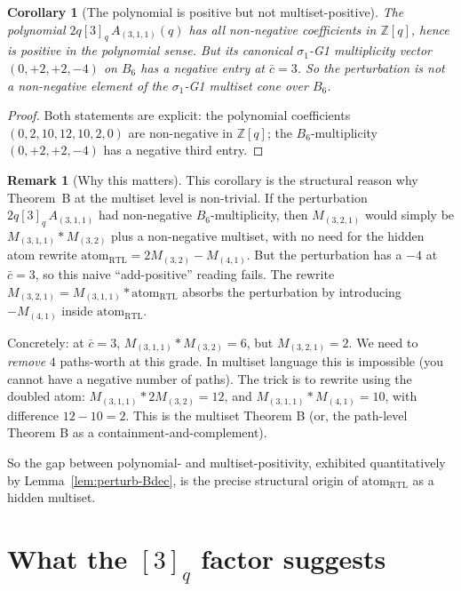 \documentclass[11pt]{article}
\newtheorem{corollary}[theorem]{Corollary}
\theoremstyle{definition}
\newtheorem{remark}[theorem]{Remark}
\begin{document}
\begin{corollary}[The polynomial is positive but not multiset-positive]\label{cor:gap}
The polynomial $2q[3]_q\, A_{(3,1,1)}(q)$ has all non-negative coefficients in $\mathbb{Z}[q]$, hence is positive in the polynomial sense. But its canonical $\sigma_1$-G1 multiplicity vector $(0, +2, +2, -4)$ on $B_6$ has a negative entry at $\bar c = 3$. So the perturbation is \emph{not} a non-negative element of the $\sigma_1$-G1 multiset cone over $B_6$.
\end{corollary}

\begin{proof}
Both statements are explicit: the polynomial coefficients $(0, 2, 10, 12, 10, 2, 0)$ are non-negative in $\mathbb{Z}[q]$; the $B_6$-multiplicity $(0, +2, +2, -4)$ has a negative third entry.
\end{proof}

\begin{remark}[Why this matters]\label{rem:matter}
This corollary is the structural reason why Theorem~B at the multiset level is non-trivial. If the perturbation $2q[3]_q\, A_{(3,1,1)}$ had non-negative $B_6$-multiplicity, then $M_{(3,2,1)}$ would simply be $M_{(3,1,1)} \ast M_{(3,2)}$ plus a non-negative multiset, with no need for the hidden atom rewrite $\mathrm{atom}_{\mathrm{RTL}} = 2 M_{(3,2)} - M_{(4,1)}$. But the perturbation has a $-4$ at $\bar c = 3$, so this naive ``add-positive'' reading fails. The rewrite $M_{(3,2,1)} = M_{(3,1,1)} \ast \mathrm{atom}_{\mathrm{RTL}}$ absorbs the perturbation by introducing $-M_{(4,1)}$ inside $\mathrm{atom}_{\mathrm{RTL}}$.

Concretely: at $\bar c = 3$, $M_{(3,1,1)} \ast M_{(3,2)} = 6$, but $M_{(3,2,1)} = 2$. We need to \emph{remove} $4$ paths-worth at this grade. In multiset language this is impossible (you cannot have a negative number of paths). The trick is to rewrite using the doubled atom: $M_{(3,1,1)} \ast 2 M_{(3,2)} = 12$, and $M_{(3,1,1)} \ast M_{(4,1)} = 10$, with difference $12 - 10 = 2$. This is the multiset Theorem B (or, the path-level Theorem B as a containment-and-complement).

So the gap between polynomial- and multiset-positivity, exhibited
quantitatively by Lemma~\ref{lem:perturb-Bdec}, is the precise structural
origin of $\mathrm{atom}_{\mathrm{RTL}}$ as a hidden multiset.
\end{remark}

\section{What the $[3]_q$ factor suggests}
\end{document}
